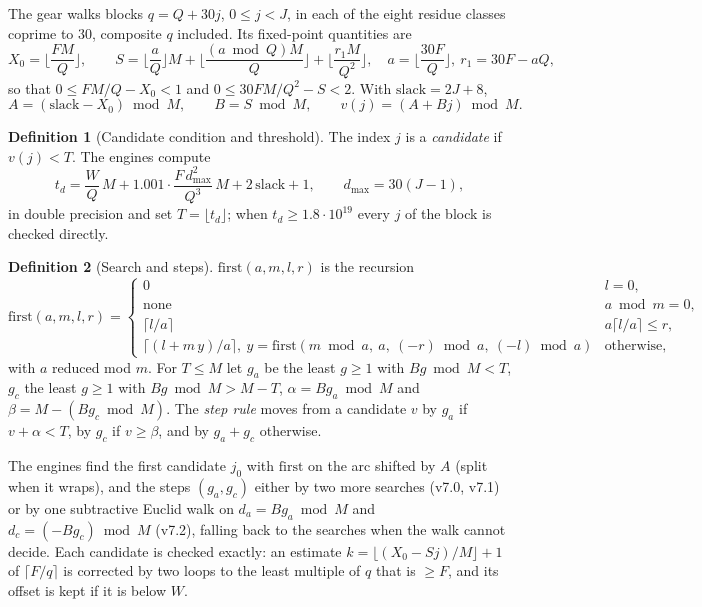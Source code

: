 \documentclass[11pt]{amsart}
\newcommand{\fn}[1]{\mathrm{#1}}
\theoremstyle{definition}
\newtheorem{definition}{Definition}
\begin{document}
The gear walks blocks $q = Q + 30j$, $0 \le j < J$, in each of the eight residue classes
coprime to $30$, composite $q$ included. Its fixed-point quantities are
\[
  X_0 = \Big\lfloor \frac{F M}{Q} \Big\rfloor,\qquad
  S = \Big\lfloor \frac{a}{Q} \Big\rfloor M + \Big\lfloor \frac{(a \bmod Q) M}{Q}\Big\rfloor
    + \Big\lfloor \frac{r_1 M}{Q^2}\Big\rfloor,\quad a = \Big\lfloor \frac{30F}{Q}\Big\rfloor,\
    r_1 = 30F - aQ,
\]
so that $0 \le FM/Q - X_0 < 1$ and $0 \le 30FM/Q^2 - S < 2$. With $\fn{slack} = 2J + 8$,
\[
  A = (\fn{slack} - X_0) \bmod M,\qquad B = S \bmod M,\qquad v(j) = (A + Bj) \bmod M .
\]

\begin{definition}[Candidate condition and threshold]
The index $j$ is a \emph{candidate} if $v(j) < T$. The engines compute
\[
  t_d = \frac{W}{Q}\,M + 1.001\cdot\frac{F\,d_{\max}^2}{Q^3}\,M + 2\,\fn{slack} + 1,
  \qquad d_{\max} = 30(J-1),
\]
in double precision and set $T = \lfloor t_d \rfloor$; when $t_d \ge 1.8\cdot 10^{19}$ every
$j$ of the block is checked directly.
\end{definition}

\begin{definition}[Search and steps]
$\fn{first}(a, m, l, r)$ is the recursion
\[
\fn{first}(a, m, l, r) = \begin{cases}
 0 & l = 0,\\
 \text{none} & a \bmod m = 0,\\
 \lceil l/a \rceil & a\lceil l/a\rceil \le r,\\
 \big\lceil (l + m\,y)/a \big\rceil,\ y = \fn{first}(m \bmod a,\ a,\ (-r) \bmod a,\
   (-l) \bmod a) & \text{otherwise,}
\end{cases}
\]
with $a$ reduced mod $m$. For $T \le M$ let $g_a$ be the least $g \ge 1$ with
$Bg \bmod M < T$, $g_c$ the least $g \ge 1$ with $Bg \bmod M > M - T$,
$\alpha = Bg_a \bmod M$ and $\beta = M - (Bg_c \bmod M)$. The \emph{step rule} moves from a
candidate $v$ by $g_a$ if $v + \alpha < T$, by $g_c$ if $v \ge \beta$, and by $g_a + g_c$
otherwise.
\end{definition}

The engines find the first candidate $j_0$ with $\fn{first}$ on the arc shifted by $A$ (split
when it wraps), and the steps $(g_a, g_c)$ either by two more searches (v7.0, v7.1) or by one
subtractive Euclid walk on $d_a = Bg_a \bmod M$ and $d_c = (-Bg_c) \bmod M$ (v7.2), falling
back to the searches when the walk cannot decide. Each candidate is checked exactly: an
estimate $k = \lfloor (X_0 - Sj)/M \rfloor + 1$ of $\lceil F/q \rceil$ is corrected by two
loops to the least multiple of $q$ that is $\ge F$, and its offset is kept if it is below $W$.
\end{document}

